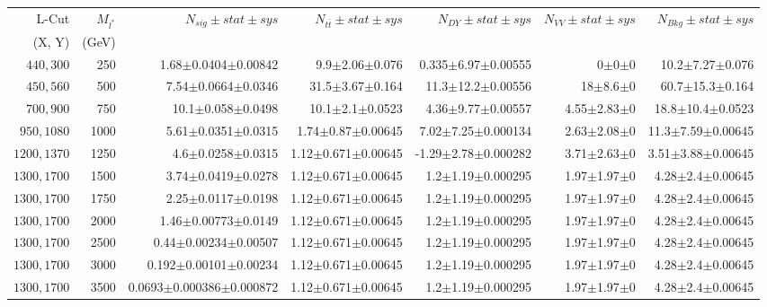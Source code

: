 \documentclass[]{article}
\begin{document}
\begin{table}
\begin{center}
\scriptsize{
\begin{tabular}{ |r|r|r|r|r|r|r|}
\hline 
L-Cut & $M_{l^*}$ & $N_{sig}\pm stat \pm sys $ &$N_{t\bar{t}}\pm stat \pm sys $ & $N_{DY}\pm stat \pm sys $ & $N_{VV}\pm stat \pm sys $ &$N_{Bkg}\pm stat \pm sys$\\
(X, Y) & (GeV) & && &&\\
\hline 
$440, 300$ & 250 & 1.68$\pm$0.0404$\pm$0.00842 & 9.9$\pm$2.06$\pm$0.076 & 0.335$\pm$6.97$\pm$0.00555 & 0$\pm$0$\pm$0 & 10.2$\pm$7.27$\pm$0.076 \\
$450, 560$ & 500 & 7.54$\pm$0.0664$\pm$0.0346 & 31.5$\pm$3.67$\pm$0.164 & 11.3$\pm$12.2$\pm$0.00556 & 18$\pm$8.6$\pm$0 & 60.7$\pm$15.3$\pm$0.164 \\
$700, 900$ & 750 & 10.1$\pm$0.058$\pm$0.0498 & 10.1$\pm$2.1$\pm$0.0523 & 4.36$\pm$9.77$\pm$0.00557 & 4.55$\pm$2.83$\pm$0 & 18.8$\pm$10.4$\pm$0.0523 \\
$950, 1080$ & 1000 & 5.61$\pm$0.0351$\pm$0.0315 & 1.74$\pm$0.87$\pm$0.00645 & 7.02$\pm$7.25$\pm$0.000134 & 2.63$\pm$2.08$\pm$0 & 11.3$\pm$7.59$\pm$0.00645 \\
$1200, 1370$ & 1250 & 4.6$\pm$0.0258$\pm$0.0315 & 1.12$\pm$0.671$\pm$0.00645 & -1.29$\pm$2.78$\pm$0.000282 & 3.71$\pm$2.63$\pm$0 & 3.51$\pm$3.88$\pm$0.00645 \\
$1300, 1700$ & 1500 & 3.74$\pm$0.0419$\pm$0.0278 & 1.12$\pm$0.671$\pm$0.00645 & 1.2$\pm$1.19$\pm$0.000295 & 1.97$\pm$1.97$\pm$0 & 4.28$\pm$2.4$\pm$0.00645 \\
$1300, 1700$ & 1750 & 2.25$\pm$0.0117$\pm$0.0198 & 1.12$\pm$0.671$\pm$0.00645 & 1.2$\pm$1.19$\pm$0.000295 & 1.97$\pm$1.97$\pm$0 & 4.28$\pm$2.4$\pm$0.00645 \\
$1300, 1700$ & 2000 & 1.46$\pm$0.00773$\pm$0.0149 & 1.12$\pm$0.671$\pm$0.00645 & 1.2$\pm$1.19$\pm$0.000295 & 1.97$\pm$1.97$\pm$0 & 4.28$\pm$2.4$\pm$0.00645 \\
$1300, 1700$ & 2500 & 0.44$\pm$0.00234$\pm$0.00507 & 1.12$\pm$0.671$\pm$0.00645 & 1.2$\pm$1.19$\pm$0.000295 & 1.97$\pm$1.97$\pm$0 & 4.28$\pm$2.4$\pm$0.00645 \\
$1300, 1700$ & 3000 & 0.192$\pm$0.00101$\pm$0.00234 & 1.12$\pm$0.671$\pm$0.00645 & 1.2$\pm$1.19$\pm$0.000295 & 1.97$\pm$1.97$\pm$0 & 4.28$\pm$2.4$\pm$0.00645 \\
$1300, 1700$ & 3500 & 0.0693$\pm$0.000386$\pm$0.000872 & 1.12$\pm$0.671$\pm$0.00645 & 1.2$\pm$1.19$\pm$0.000295 & 1.97$\pm$1.97$\pm$0 & 4.28$\pm$2.4$\pm$0.00645 \\

\end{tabular}}
\end{center}
\end{table}
\end{document}
